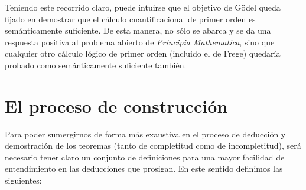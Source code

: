 Teniendo este recorrido claro, puede intuirse que el objetivo de Gödel queda fijado en demostrar que el cálculo cuantificacional de primer orden es semánticamente suficiente.
De esta manera, no sólo se abarca y se da una respuesta positiva al problema abierto de \textit{Principia Mathematica}, sino que cualquier otro cálculo lógico de primer orden
(incluido el de Frege) quedaría probado como semánticamente suficiente también. 

\section{El proceso de construcción}

Para poder sumergirnos de forma más exaustiva en el proceso de deducción y demostración de los teoremas (tanto de completitud  como
de incompletitud), será necesario tener claro un conjunto de definiciones para una mayor facilidad de entendimiento en las deducciones que prosigan. En este sentido
definimos las siguientes:
